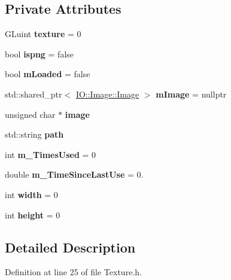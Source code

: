 \subsection*{Private Attributes}
\begin{DoxyCompactItemize}
\item 
G\+Luint {\bfseries texture} = 0\hypertarget{classe_texture_ad971f45612dacb43ca0d7c15ae756f1d}{}\label{classe_texture_ad971f45612dacb43ca0d7c15ae756f1d}

\item 
bool {\bfseries ispng} = false\hypertarget{classe_texture_ab3cb12de02f93a233af596ade029a198}{}\label{classe_texture_ab3cb12de02f93a233af596ade029a198}

\item 
bool {\bfseries m\+Loaded} = false\hypertarget{classe_texture_afd1aa1585fb7feddc59d36b51844f2aa}{}\label{classe_texture_afd1aa1585fb7feddc59d36b51844f2aa}

\item 
std\+::shared\+\_\+ptr$<$ \hyperlink{class_i_o_1_1_image_1_1_image}{I\+O\+::\+Image\+::\+Image} $>$ {\bfseries m\+Image} = nullptr\hypertarget{classe_texture_a558fbc7ce2ab879f6c76bd87130c5487}{}\label{classe_texture_a558fbc7ce2ab879f6c76bd87130c5487}

\item 
unsigned char $\ast$ {\bfseries image}\hypertarget{classe_texture_a30335ac7950cd767cf4aa2b8013cc1c0}{}\label{classe_texture_a30335ac7950cd767cf4aa2b8013cc1c0}

\item 
std\+::string {\bfseries path}\hypertarget{classe_texture_aa6eaae046d23ecfa2d957ec1255b9c86}{}\label{classe_texture_aa6eaae046d23ecfa2d957ec1255b9c86}

\item 
int {\bfseries m\+\_\+\+Times\+Used} = 0\hypertarget{classe_texture_afb728f12c3c2ab27fbb59c8bcb652eb3}{}\label{classe_texture_afb728f12c3c2ab27fbb59c8bcb652eb3}

\item 
double {\bfseries m\+\_\+\+Time\+Since\+Last\+Use} = 0.\hypertarget{classe_texture_a6b9bbf09f6b63a36afc6ee0e18aced0e}{}\label{classe_texture_a6b9bbf09f6b63a36afc6ee0e18aced0e}

\item 
int {\bfseries width} = 0\hypertarget{classe_texture_ac01c2228b2de88acd9441de9d094f8af}{}\label{classe_texture_ac01c2228b2de88acd9441de9d094f8af}

\item 
int {\bfseries height} = 0\hypertarget{classe_texture_a607169804cdbbc9e4adb3211efd91cd0}{}\label{classe_texture_a607169804cdbbc9e4adb3211efd91cd0}

\end{DoxyCompactItemize}


\subsection{Detailed Description}


Definition at line 25 of file Texture.\+h.

